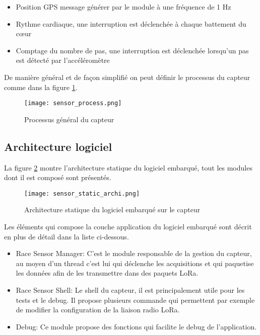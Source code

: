 \begin{itemize}
\item Position GPS message générer par le module à une fréquence de 1 Hz
\item Rythme cardiaque, une interruption est déclenchée à chaque battement du cœur
\item Comptage du nombre de pas, une interruption est déclenchée lorsqu'un pas est détecté par l'accéléromètre
\end{itemize}

De manière général et de façon simplifié on peut définir le processus du capteur comme dans la figure \ref{fig:sensor_process}.

\begin{figure}[htb]
\centering 
\texttt{[image: sensor\_process.png]} 
\caption{Processus général du capteur}
\label{fig:sensor_process}
\end{figure}

\subsection{Architecture logiciel}

La figure \ref{fig:sensor_static_archi} montre l'architecture statique du logiciel embarqué, tout les modules dont il est composé sont présentés.

\begin{figure}[htb]
\centering 
\texttt{[image: sensor\_static\_archi.png]} 
\caption{Architecture statique du logiciel embarqué sur le capteur}
\label{fig:sensor_static_archi}
\end{figure}

Les éléments qui compose la couche application du logiciel embarqué sont décrit en plus de détail dans la liste ci-dessous.

\begin{itemize}
\item Race Sensor Manager: C'est le module responsable de la gestion du capteur, au moyen d'un thread c'est lui qui déclenche les acquisitions et qui paquetise les données afin de les transmettre dans des paquets LoRa.
\item Race Sensor Shell: Le shell du capteur, il est principalement utile pour les tests et le debug. Il propose plusieurs commande qui permettent par exemple de modifier la configuration de la liaison radio LoRa.
\item Debug: Ce module propose des fonctions qui facilite le debug de l'application.
\end{itemize}

